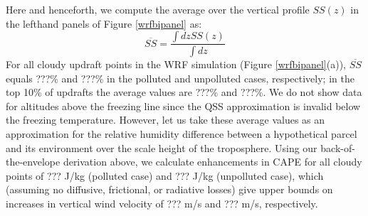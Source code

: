 \documentclass{article}
\begin{document}
Here and henceforth, we compute the average over the vertical profile $SS(z)$ in the lefthand panels of Figure \ref{wrfbipanel} as:
\begin{equation}
\label{avgss}
\overline{SS} = \frac{\int dz SS(z)}{\int dz}
\end{equation}
For all cloudy updraft points in the WRF simulation (Figure \ref{wrfbipanel}(a)), $\overline{SS}$ equals ???\% and ???\% in the polluted and unpolluted cases, respectively; in the top 10\% of updrafts the average values are ???\% and ???\%. We do not show data for altitudes above the freezing line since the QSS approximation is invalid below the freezing temperature. However, let us take these average values as an approximation for the relative humidity difference between a hypothetical parcel and its environment over the scale height of the troposphere. Using our back-of-the-envelope derivation above, we calculate enhancements in CAPE for all cloudy points of ??? J/kg (polluted case) and ??? J/kg (unpolluted case), which (assuming no diffusive, frictional, or radiative losses) give upper bounds on increases in vertical wind velocity of ??? m/s and ??? m/s, respectively.
\end{document}
